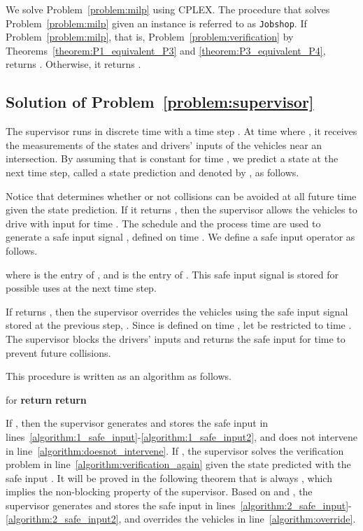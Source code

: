 \documentclass{sig-alternate}
\begin{document}
We solve Problem~\ref{problem:milp} using CPLEX. The procedure that solves Problem~\ref{problem:milp} given an instance  is referred to as \texttt{Jobshop}. If  Problem~\ref{problem:milp}, that is,  Problem~\ref{problem:verification} by Theorems~\ref{theorem:P1_equivalent_P3} and \ref{theorem:P3_equivalent_P4},  returns . Otherwise, it returns . 

\subsection{Solution of Problem~\ref{problem:supervisor}}\label{section:supervisor}
 The supervisor runs in discrete time with a time step . At time  where , it receives the measurements of the states  and drivers' inputs  of the vehicles near an intersection. By assuming that  is constant for time , we predict a state at the next time step, called a state prediction and denoted by , as follows.

 
 Notice that  determines whether or not collisions can be avoided at all future time given the state prediction. If it returns , then the supervisor allows the vehicles to drive with input  for time . The schedule  and the process time  are used to generate a safe input signal , defined on time . We define a safe input operator  as follows.
 
 where  is the  entry of , and  is the  entry of . This safe input signal is stored for possible uses at the next time step.
 
 If  returns , then the supervisor overrides the vehicles using the safe input signal stored at the previous step, . Since  is defined on time , let  be  restricted to time . The supervisor blocks the drivers' inputs  and returns the safe input  for time  to prevent future collisions.

This procedure is written as an algorithm as follows.
\begin{algorithm}[H]
	\caption{}
	\label{algorithm:supervisor}
	\begin{algorithmic}[1]
		\State \label{algorithm:solve_verification1}
		\If{}
		\State \label{algorithm:1_safe_input}
		\State  for \label{algorithm:1_safe_input2}
		\State \textbf{return} \label{algorithm:doesnot_intervene}
		\Else
		\State \label{algorithm:verification_again}
		\State \label{algorithm:2_safe_input}
		\State \label{algorithm:2_safe_input2}
		\State \textbf{return} \label{algorithm:override}
		\EndIf
	\end{algorithmic}
\end{algorithm}
If , then the supervisor generates and stores the safe input  in lines~\ref{algorithm:1_safe_input}-\ref{algorithm:1_safe_input2}, and does not intervene in line~\ref{algorithm:doesnot_intervene}. If , the supervisor solves the verification problem in line~\ref{algorithm:verification_again} given the state predicted with the safe input . It will be proved in the following theorem that  is always , which implies the non-blocking property of the supervisor. Based on  and , the supervisor generates and stores the safe input  in lines~\ref{algorithm:2_safe_input}-\ref{algorithm:2_safe_input2}, and overrides the vehicles in line~\ref{algorithm:override}.
\end{document}
